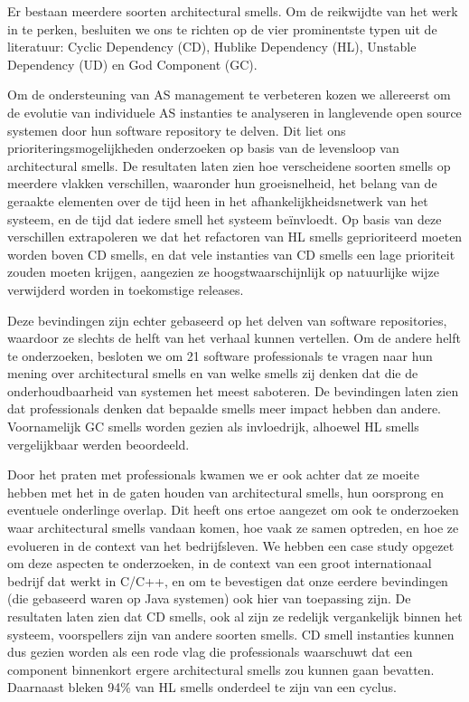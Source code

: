 {Er bestaan meerdere soorten architectural smells. Om de reikwijdte van het werk in te perken, besluiten we ons te richten op de vier prominentste typen uit de literatuur: Cyclic Dependency (CD), Hublike Dependency (HL), Unstable Dependency (UD) en God Component (GC).

Om de ondersteuning van AS management te verbeteren kozen we allereerst om de evolutie van individuele AS instanties te analyseren in langlevende open source systemen door hun software repository te delven. Dit liet ons prioriteringsmogelijkheden onderzoeken op basis van de levensloop van architectural smells. De resultaten laten zien hoe verscheidene soorten smells op meerdere vlakken verschillen, waaronder hun groeisnelheid, het belang van de geraakte elementen over de tijd heen in het afhankelijkheidsnetwerk van het systeem, en de tijd dat iedere smell het systeem beïnvloedt. Op basis van deze verschillen extrapoleren we dat het refactoren van HL smells geprioriteerd moeten worden boven CD smells, en dat vele instanties van CD smells een lage prioriteit zouden moeten krijgen, aangezien ze hoogstwaarschijnlijk op natuurlijke wijze verwijderd worden in toekomstige releases.

Deze bevindingen zijn echter gebaseerd op het delven van software repositories, waardoor ze slechts de helft van het verhaal kunnen vertellen. Om de andere helft te onderzoeken, besloten we om 21 software professionals te vragen naar hun mening over architectural smells en van welke smells zij denken dat die de onderhoudbaarheid van systemen het meest saboteren. De bevindingen laten zien dat professionals denken dat bepaalde smells meer impact hebben dan andere. Voornamelijk GC smells worden gezien als invloedrijk, alhoewel HL smells vergelijkbaar werden beoordeeld.

Door het praten met professionals kwamen we er ook achter dat ze moeite hebben met het in de gaten houden van architectural smells, hun oorsprong en eventuele onderlinge overlap. Dit heeft ons ertoe aangezet om ook te onderzoeken waar architectural smells vandaan komen, hoe vaak ze samen optreden, en hoe ze evolueren in de context van het bedrijfsleven. We hebben een case study opgezet om deze aspecten te onderzoeken, in de context van een groot internationaal bedrijf dat werkt in C/C++, en om te bevestigen dat onze eerdere bevindingen (die gebaseerd waren op Java systemen) ook hier van toepassing zijn. De resultaten laten zien dat CD smells, ook al zijn ze redelijk vergankelijk binnen het systeem, voorspellers zijn van andere soorten smells. CD smell instanties kunnen dus gezien worden als een rode vlag die professionals waarschuwt dat een component binnenkort ergere architectural smells zou kunnen gaan bevatten. Daarnaast bleken 94\% van HL smells onderdeel te zijn van een cyclus. 

}
